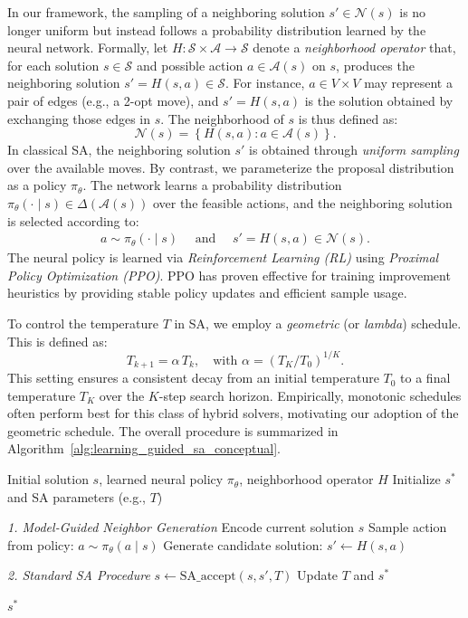 \documentclass[letterpaper]{article} %
\begin{document}
In our framework, the sampling of a neighboring solution $s' \in \mathcal{N}(s)$ is no longer uniform but instead follows a probability distribution learned by the neural network. Formally, let $H: \mathcal{S} \times \mathcal{A} \to \mathcal{S}$ denote a \textit{neighborhood operator} that, for each solution $s \in \mathcal{S}$ and possible action $a \in \mathcal{A}(s)$ on $s$, produces the neighboring solution $s' = H(s, a) \in \mathcal{S}$. For instance, $a \in V \times V$ may represent a pair of edges (e.g., a 2-opt move), and $s' = H(s, a)$ is the solution obtained by exchanging those edges in $s$. The neighborhood of $s$ is thus defined as:
$$
\mathcal{N}(s) = \left\{ H(s, a) : a \in \mathcal{A}(s) \right\}.
$$
In classical SA, the neighboring solution $s'$ is obtained through \textit{uniform sampling} over the available moves. By contrast, we parameterize the proposal distribution as a policy $\pi_\theta$. The network learns a probability distribution $\pi_\theta(\cdot \mid s) \in \Delta(\mathcal{A}(s))$ over the feasible actions, and the neighboring solution is selected according to:
\begin{align*}
a \sim \pi_\theta(\cdot \mid s) \quad \text{ and } \quad s' = H(s, a) \in \mathcal{N}(s).
\end{align*}
The neural policy is learned via \textit{Reinforcement Learning (RL)} using \textit{Proximal Policy Optimization (PPO)}. PPO has proven effective for training improvement heuristics by providing stable policy updates and efficient sample usage.

To control the temperature $T$ in SA, we employ a \textit{geometric} (or \textit{lambda}) schedule. This is defined as:
$$
T_{k+1} = \alpha \, T_k, \quad \text{with } \alpha = \left( {T_K /T_0} \right)^{1/K}.
$$
This setting ensures a consistent decay from an initial temperature $T_0$ to a final temperature $T_K$ over the $K$-step search horizon. Empirically, monotonic schedules often perform best for this class of hybrid solvers, motivating our adoption of the geometric schedule. The overall procedure is summarized in Algorithm~\ref{alg:learning_guided_sa_conceptual}.

\begin{algorithm}[h!]
\begin{algorithmic}[1]
\caption{Overview of the Learning-Guided SA}
\label{alg:learning_guided_sa_conceptual}
\Require Initial solution $s$, learned neural policy $\pi_\theta$, neighborhood operator $H$
\State Initialize $s^*$ and SA parameters (e.g., $T$)

    \State \textit{1. Model-Guided Neighbor Generation}
    \State \quad Encode current solution $s$
    \State \quad Sample action from policy: $a \sim \pi_\theta(a \mid s)$
    \State \quad Generate candidate solution: $s' \gets H(s, a)$
    
    \State \textit{2. Standard SA Procedure}
    \State \quad $s \gets \text{SA\_accept}(s, s', T)$ 
    \State \quad Update $T$ and $s^*$
\EndWhile

\State \Return $s^*$
\end{algorithmic}
\end{algorithm}
\end{document}
